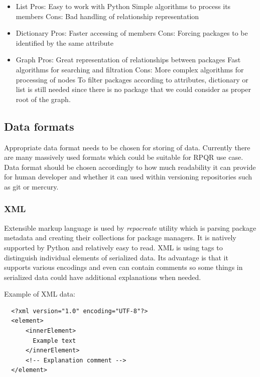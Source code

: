 \newpage

\begin{itemize}
  \item List
    \subitem Pros:
    \subsubitem Easy to work with Python
    \subsubitem Simple algorithms to process its members
    \subitem Cons:
    \subsubitem Bad handling of relationship representation
  \item Dictionary
    \subitem Pros:
    \subsubitem Faster accessing of members
    \subitem Cons:
    \subsubitem Forcing packages to be identified by the same attribute
  \item Graph
    \subitem Pros:
    \subsubitem Great representation of relationships between packages
    \subsubitem Fast algorithms for searching and filtration
    \subitem Cons:
    \subsubitem More complex algorithms for processing of nodes
    \subsubitem To filter packages according to attributes, dictionary or list is still needed
                since there is no package that we could consider as proper root of the graph.
\end{itemize}

\subsection*{Data formats}
Appropriate data format needs to be chosen for storing of data. Currently there are many massively
used formats which could be suitable for RPQR use case. Data format should be chosen accordingly to
how much readability it can provide for human developer and whether it can used within versioning
repositories such as git or mercury.

\subsubsection*{XML}
Extensible markup language\cite{XMLFormat} is used by \textit{repocreate} utility which is parsing package metadata and creating
their collections for package managers. It is natively supported by Python and relatively easy to
read. XML is using tags to distinguish individual elements of serialized data. Its advantage
is that it supports various encodings and even can contain comments so some things in serialized
data could have additional explanations when needed.

\newpage

Example of XML data:
\begin{lstlisting}
  <?xml version="1.0" encoding="UTF-8"?>
  <element>
      <innerElement>
        Example text
      </innerElement>
      <!-- Explanation comment -->
  </element>
\end{lstlisting}


